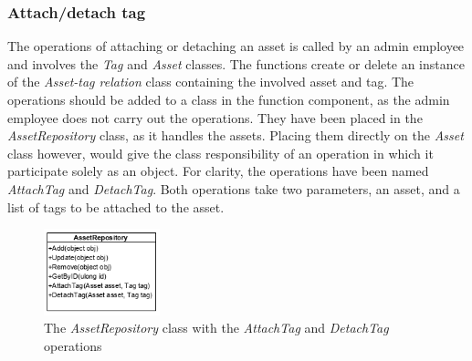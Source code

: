 \subsubsection{Attach/detach tag}
The operations of attaching or detaching an asset is called by an admin employee and involves the \textit{Tag} and \textit{Asset} classes. The functions create or delete an instance of the \textit{Asset-tag relation} class containing the involved asset and tag. The operations should be added to a class in the function component, as the admin employee does not carry out the operations. They have been placed in the \textit{AssetRepository} class, as it handles the assets. Placing them directly on the \textit{Asset} class however, would give the class responsibility of an operation in which it participate solely as an object. For clarity, the operations have been named \textit{AttachTag} and \textit{DetachTag}. Both operations take two parameters, an asset, and a list of tags to be attached to the asset.
\begin{figure}[H]
    \centering
    \includegraphics[width=0.3\textwidth]{figures/FunctionComponent/AttachTag.png}
    \caption{The \textit{AssetRepository} class with the \textit{AttachTag} and \textit{DetachTag} operations}
    \label{fig:AttachDetachTag}
\end{figure}

